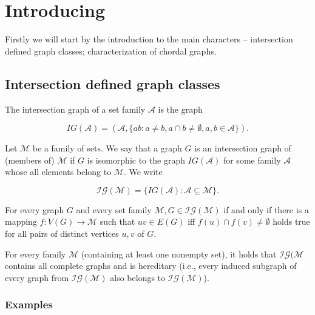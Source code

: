 \chapter{Introducing}

Firstly we will start by the introduction to the main characters -- intersection defined graph classes; characterization of chordal graphs.

\section{Intersection defined graph classes}

\begin{defn}
	The intersection graph of a set family $\mathcal{A}$ is the graph
	
	$$
	IG(\mathcal{A}) = (\mathcal{A}, \{ab : a \neq b, a \cap b \neq \emptyset, a, b \in \mathcal{A}\}).
	$$
\end{defn}

\begin{defn}
	Let $\mathcal{M}$ be a family of sets. We say that a graph $G$ is an intersection graph of (members of) $\mathcal{M}$ if $G$ is isomorphic to the graph $IG(\mathcal{A})$ for some family $\mathcal{A}$ whose all elements belong to $\mathcal{M}$. We write
	
	$$
	\mathcal{IG}(\mathcal{M}) = \{IG(\mathcal{A}) : \mathcal{A} \subseteq \mathcal{M}\}.
	$$
\end{defn}

\begin{observ}
	For every graph $G$ and every set family $\mathcal{M}, G \in \mathcal{IG}(\mathcal{M})$ if and only if there is a mapping $f : V (G) \to \mathcal{M}$ such that $uv \in E(G)$ iff $f(u) \cap f(v) \neq \emptyset$ holds true for all pairs of distinct vertices $u, v$ of $G$.
\end{observ}

\begin{observ}
	For every family $\mathcal{M}$ (containing at least one nonempty set), it holds that $\mathcal{IG}(\mathcal{M}$ contains all complete graphs and is hereditary (i.e., every induced subgraph of every graph from $\mathcal{IG}(\mathcal{M})$ also	belongs to $\mathcal{IG}(\mathcal{M})$).
\end{observ}

\subsection{Examples}

